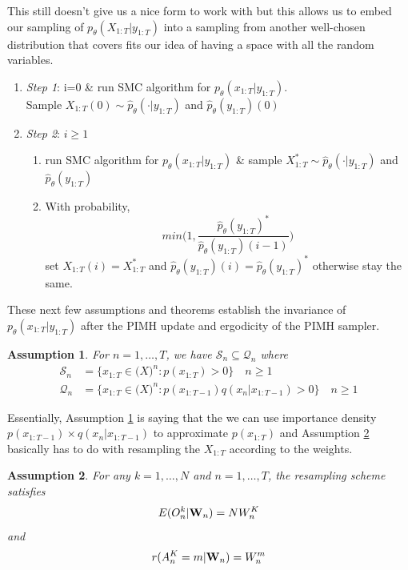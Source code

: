 \documentclass{article}\usepackage[]{graphicx}\usepackage[]{color}
\newtheorem{assumption}{Assumption}
\theoremstyle{definition}
\begin{document}
This still doesn't give us a nice form to work with but this allows us to embed our sampling of $p_\theta(X_{1:T}|y_{1:T})$ into a sampling from another well-chosen distribution that covers fits our idea of having a space with all the random variables. 

\begin{enumerate}
  \item[] \textit{Step 1}: i=0 \& run SMC algorithm for $p_\theta(x_{1:T}|y_{1:T})$.\\
  Sample $X_{1:T}(0) \sim \hat{p}_\theta(\cdot|y_{1:T})$ and $\hat{p}_\theta(y_{1:T})(0)$
%
%
  \item[] \textit{Step 2}: $i \geq 1$
  \begin{enumerate}
    \item run SMC algorithm for $p_\theta(x_{1:T}|y_{1:T})$ \& sample $X^*_{1:T} \sim \hat{p}_\theta(\cdot|y_{1:T})$ and $\hat{p}_\theta(y_{1:T})$
    \item With probability,
    \begin{equation*}
       min \Bigg( 1, \frac{\hat{p}_\theta(y_{1:T})^*}{\hat{p}_\theta(y_{1:T})(i-1)} \Bigg)
    \end{equation*}
    set $X_{1:T}(i) = X^*_{1:T}$ and $\hat{p}_\theta(y_{1:T})(i) = \hat{p}_\theta(y_{1:T})^*$ otherwise stay the same.
  \end{enumerate}
\end{enumerate}


These next few assumptions and theorems establish the invariance of $p_\theta(x_{1:T}|y_{1:T})$ after the PIMH update and ergodicity of the PIMH sampler.

\begin{assumption}\label{asm:pap1}
For $n=1,\ldots,T$, we have $\mathcal{S}_n \subseteq \mathcal{Q}_n$
where
\begin{align*}
\mathcal{S}_n & = \{ x_{1:T} \in \mathcal(X)^n: p(x_{1:T}) > 0 \} \quad n \geq 1 \\
\mathcal{Q}_n & = \{ x_{1:T} \in \mathcal(X)^n:  p(x_{1:T-1}) q(x_n|x_{1:T-1}) > 0\} \quad n \geq 1
\end{align*}
\end{assumption}

Essentially, Assumption \ref{asm:pap1} is saying that the we can use importance density $p(x_{1:T-1}) \times q(x_n|x_{1:T-1})$ to approximate $p(x_{1:T})$ and Assumption \ref{asm:pap2} basically has to do with resampling the $X_{1:T}$ according to the weights.

\begin{assumption}\label{asm:pap2}
For any $k=1,\ldots,N$ and $n=1,\ldots,T$, the resampling scheme satisfies 
\begin{equation}
E(O^k_n|{\bf W}_n) = NW^K_n
\end{equation}
and
\begin{equation}
r(A^K_n = m | {\bf W}_n) = W^m_n
\end{equation}
\end{assumption}
\end{document}
